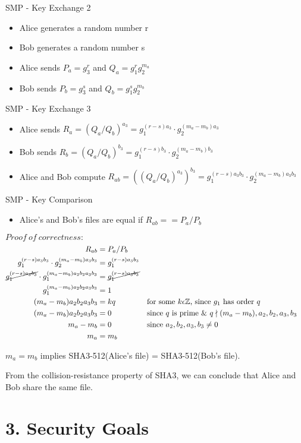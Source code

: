 \documentclass{article}
\begin{document}
SMP - Key Exchange 2
\begin{itemize}
  \item Alice generates a random number r
  \item Bob generates a random number s
  \item Alice sends $P_a = g_3^r$ and $Q_a = g_1^rg_2^{m_a}$
  \item Bob sends $P_b = g_3^s$ and $Q_b = g_1^sg_2^{m_b}$
\end{itemize}

SMP - Key Exchange 3
\begin{itemize}
  \item Alice sends $R_a = (Q_a/Q_b)^{a_3} = g_1^{(r-s)a_3}\cdot g_2^{(m_a-m_b)a_3}$
  \item Bob sends $R_b = (Q_a/Q_b)^{b_3} = g_1^{(r-s)b_3}\cdot g_2^{(m_a-m_b)b_3}$
  \item Alice and Bob compute $R_{ab} = ((Q_a/Q_b)^{a_3})^{b_3} = 
  g_1^{(r-s)a_3b_3} \cdot g_2^{(m_a-m_b)a_3b_3}$
\end{itemize}
SMP - Key Comparison
\begin{itemize}
  \item Alice's and Bob's files are equal if $R_{ab} == P_a / P_b$
\end{itemize}

$Proof\ of\ correctness:$
\begin{align*}
  R_{ab} &= P_a / P_b\\
  g_1^{(r-s)a_3b_3} \cdot g_2^{(m_a-m_b)a_3b_3} &= g_1^{(r-s)a_3b_3}\\
  \cancel{g_1^{(r-s)a_3b_3}} \cdot g_1^{(m_a-m_b)a_2b_2a_3b_3} &= \cancel{g_1^{(r-s)a_3b_3}}\\
  g_1^{(m_a-m_b)a_2b_2a_3b_3} &= 1\\
  (m_a-m_b)a_2b_2a_3b_3 &= kq && \text{for some $k \epsilon \mathbb{Z}$, since $g_1$ has order $q$}\\
  (m_a-m_b)a_2b_2a_3b_3 &= 0 && \text{since $q$ is prime \&\ } q \nmid (m_a-m_b), a_2, b_2,a_3, b_3\\
  m_a - m_b &= 0 &&\text{since $a_2, b_2, a_3, b_3 \neq 0$}\\
  m_a &= m_b
\end{align*}

$m_a = m_b$ implies SHA3-512(Alice's file) = SHA3-512(Bob's file).

From the collision-resistance property of SHA3, we can conclude that Alice and Bob 
share the same file.

\section*{3. Security Goals}
\end{document}
